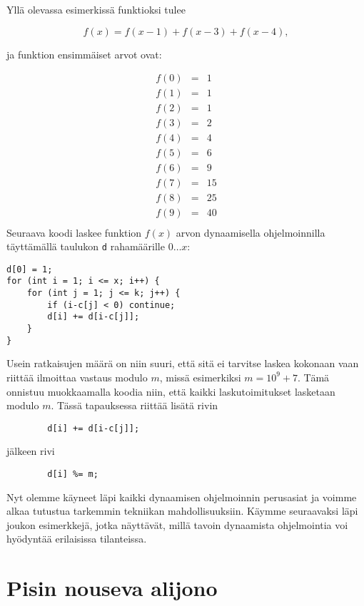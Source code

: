 Yllä olevassa esimerkissä funktioksi tulee

\[ f(x) = f(x-1)+f(x-3)+f(x-4), \]

ja funktion ensimmäiset arvot ovat:

\[
\begin{array}{lcl}
f(0) & = & 1 \\
f(1) & = & 1 \\
f(2) & = & 1 \\
f(3) & = & 2 \\
f(4) & = & 4 \\
f(5) & = & 6 \\
f(6) & = & 9 \\
f(7) & = & 15 \\
f(8) & = & 25 \\
f(9) & = & 40 \\
\end{array}
\]
Seuraava koodi laskee funktion $f(x)$ arvon
dynaamisella ohjelmoinnilla täyttämällä taulukon
\texttt{d} rahamäärille $0 \ldots x$:

\begin{lstlisting}
d[0] = 1;
for (int i = 1; i <= x; i++) {
    for (int j = 1; j <= k; j++) {
        if (i-c[j] < 0) continue;
        d[i] += d[i-c[j]];
    }
}
\end{lstlisting}

Usein ratkaisujen määrä on niin suuri, että sitä ei tarvitse
laskea kokonaan vaan riittää ilmoittaa vastaus
modulo $m$, missä esimerkiksi $m=10^9+7$.
Tämä onnistuu muokkaamalla koodia niin,
että kaikki laskutoimitukset lasketaan modulo $m$.
Tässä tapauksessa riittää lisätä rivin
\begin{lstlisting}
        d[i] += d[i-c[j]];
\end{lstlisting}
jälkeen rivi
\begin{lstlisting}
        d[i] %= m;
\end{lstlisting}

Nyt olemme käyneet läpi kaikki dynaamisen ohjelmoinnin
perusasiat ja voimme alkaa tutustua
tarkemmin tekniikan mahdollisuuksiin.
Käymme seuraavaksi läpi joukon esimerkkejä,
jotka näyttävät, millä tavoin dynaamista ohjelmointia
voi hyödyntää erilaisissa tilanteissa.

\section{Pisin nouseva alijono}


